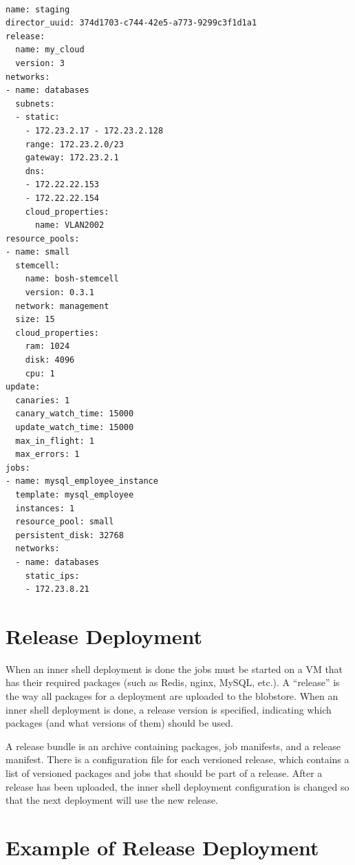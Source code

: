 \begin{adjustwidth}{2.5em}{2.5em}
\begin{verbatim}

name: staging
director_uuid: 374d1703-c744-42e5-a773-9299c3f1d1a1
release:
  name: my_cloud
  version: 3
networks:
- name: databases
  subnets:
  - static:
    - 172.23.2.17 - 172.23.2.128
    range: 172.23.2.0/23
    gateway: 172.23.2.1
    dns:
    - 172.22.22.153
    - 172.22.22.154
    cloud_properties:
      name: VLAN2002
resource_pools:
- name: small
  stemcell:
    name: bosh-stemcell
    version: 0.3.1
  network: management
  size: 15
  cloud_properties:
    ram: 1024
    disk: 4096
    cpu: 1
update:
  canaries: 1
  canary_watch_time: 15000
  update_watch_time: 15000
  max_in_flight: 1
  max_errors: 1
jobs:
- name: mysql_employee_instance
  template: mysql_employee
  instances: 1
  resource_pool: small
  persistent_disk: 32768
  networks:
  - name: databases
    static_ips:
    - 172.23.8.21

\end{verbatim}
\end{adjustwidth}

\section{Release Deployment}
\label{releasedeployment}

When an inner shell deployment is done the jobs must be started on a VM that has their required packages (such as Redis, nginx, MySQL, etc.). A ``release'' is the way all packages for a deployment are uploaded to the blobstore. When an inner shell deployment is done, a release version is specified, indicating which packages (and what versions of them) should be used.

A release bundle is an archive containing packages, job manifests, and a release manifest. There is a configuration file for each versioned release, which contains a list of versioned packages and jobs that should be part of a release. After a release has been uploaded, the inner shell deployment configuration is changed so that the next deployment will use the new release.

\section{Example of Release Deployment}
\label{exampleofreleasedeployment}

